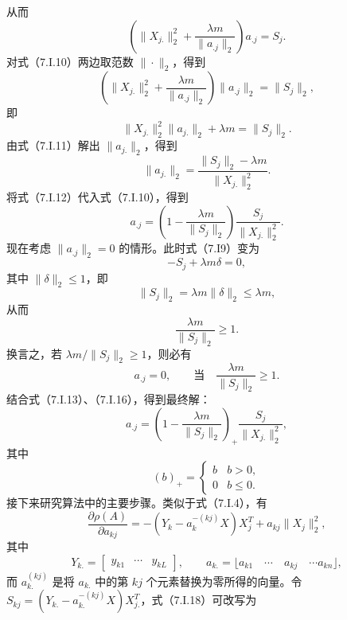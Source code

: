 从而
\begin{equation}
\left(\|X_{j.}\|_2^2+\frac{\lambda m}{\|a_{.j}\|_2}\right)a_{.j}=S_j.\tag{7.I.10}
\end{equation}
对式（7.I.10）两边取范数 $\|\cdot\|_2$，得到
\[
\left(\|X_{j.}\|_2^2+\frac{\lambda m}{\|a_{.j}\|_2}\right)
 \|a_{.j}\|_2=\|S_j\|_2,
\]
即
\begin{equation}
\|X_{j.}\|_2^2\|a_{j.}\|_2+\lambda m=\|S_j\|_2.\tag{7.I.11}
\end{equation}
由式（7.I.11）解出 $\|a_{j.}\|_2$，得到
\begin{equation}
\|a_{j.}\|_2=\frac{\|S_j\|_2-\lambda m}{\|X_{j.}\|_2^2}.\tag{7.I.12}
\end{equation}
将式（7.I.12）代入式（7.I.10），得到
\begin{equation}
a_{.j}=\left(1-\frac{\lambda m}{\|S_j\|_2}\right)
 \frac{S_j}{\|X_{j.}\|_2^2}.\tag{7.I.13}
\end{equation}
现在考虑 $\|a_{.j}\|_2=0$ 的情形。此时式（7.I9）变为
\begin{equation}
-S_j+\lambda m\delta=0,\tag{7.I.14}
\end{equation}
其中 $\|\delta\|_2\le1$，即
\[
\|S_j\|_2=\lambda m\|\delta\|_2\le\lambda m,
\]
从而
\begin{equation}
\frac{\lambda m}{\|S_j\|_2}\ge1.\tag{7.I.15}
\end{equation}
换言之，若 $\lambda m/\|S_j\|_2\ge1$，则必有
\begin{equation}
a_{.j}=0,\qquad\text{当}\quad\frac{\lambda m}{\|S_j\|_2}\ge1.\tag{7.I.16}
\end{equation}
结合式（7.I.13）、（7.I.16），得到最终解：
\begin{equation}
a_{.j}=\left(1-\frac{\lambda m}{\|S_j\|_2}\right)_+
 \frac{S_j}{\|X_{j.}\|_2^2},\tag{7.I.17}
\end{equation}
其中
\[
(b)_+=\begin{cases}b&b>0,\\0&b\le0.\end{cases}
\]
接下来研究算法中的主要步骤。类似于式（7.I.4），有
\begin{equation}
\frac{\partial\rho(A)}{\partial a_{kj}}
 =-(Y_k-a_k^{-(kj)}X)X_j^T+a_{kj}\|X_j\|_2^2,\tag{7.I.18}
\end{equation}
其中
\[
Y_{k.}=\begin{bmatrix}y_{k1}&\cdots&y_{kL}\end{bmatrix},\qquad
a_{k.}=\lfloor a_{k1}\quad\cdots\quad a_{kj}\quad\cdots a_{kn}\rfloor,
\]
而 $a_{k.}^{(kj)}$ 是将 $a_{k.}$ 中的第 $kj$ 个元素替换为零所得的向量。令 $S_{kj}=(Y_{k.}-a_{k.}^{-(kj)}X)X_{j.}^T$，式（7.I.18）可改写为
